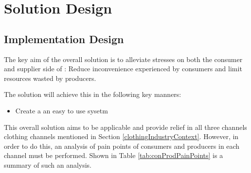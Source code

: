 \chapter{Solution Design}

\section{Implementation Design}


The key aim of the overall solution is to alleviate stresses on both the consumer and supplier side of : Reduce inconvenience experienced by consumers and limit resources wasted by producers.

The solution will achieve this in the following key manners:
\begin{itemize}
	\item Create a an easy to use sysetm
\end{itemize} 

This overall solution aims to be applicable and provide relief in all three channels clothing channels mentioned in Section \ref{clothingIndustryContext}. However, in order to do this, an analysis of pain points of consumers and producers in each channel must be performed. Shown in Table \ref{tab:conProdPainPoints} is a summary of such an analysis.

